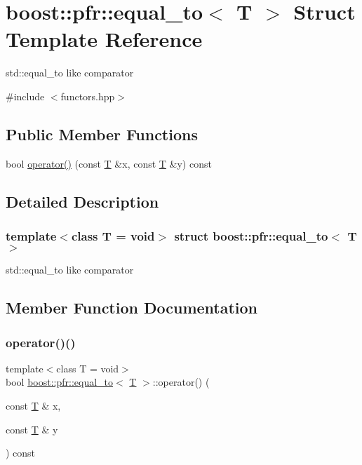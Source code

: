 \hypertarget{structboost_1_1pfr_1_1equal__to}{}\section{boost\+:\+:pfr\+:\+:equal\+\_\+to$<$ T $>$ Struct Template Reference}
\label{structboost_1_1pfr_1_1equal__to}


std\+::equal\+\_\+to like comparator  




{\ttfamily \#include $<$functors.\+hpp$>$}

\subsection*{Public Member Functions}
\begin{DoxyCompactItemize}
\item 
bool \mbox{\hyperlink{structboost_1_1pfr_1_1equal__to_abfed1f444cc5b0549bd97d2f9225a526}{operator()}} (const \mbox{\hyperlink{struct_t}{T}} \&x, const \mbox{\hyperlink{struct_t}{T}} \&y) const
\end{DoxyCompactItemize}


\subsection{Detailed Description}
\subsubsection*{template$<$class T = void$>$\newline
struct boost\+::pfr\+::equal\+\_\+to$<$ T $>$}

std\+::equal\+\_\+to like comparator 

\subsection{Member Function Documentation}
\mbox{\label{structboost_1_1pfr_1_1equal__to_abfed1f444cc5b0549bd97d2f9225a526}} 
\subsubsection{\texorpdfstring{operator()()}{operator()()}}
{\footnotesize\ttfamily template$<$class T  = void$>$ \\
bool \mbox{\hyperlink{structboost_1_1pfr_1_1equal__to}{boost\+::pfr\+::equal\+\_\+to}}$<$ \mbox{\hyperlink{struct_t}{T}} $>$\+::operator() (\begin{DoxyParamCaption}\item[{const \mbox{\hyperlink{struct_t}{T}} \&}]{x,  }\item[{const \mbox{\hyperlink{struct_t}{T}} \&}]{y }\end{DoxyParamCaption}) const\hspace{0.3cm}{\ttfamily [inline]}}

